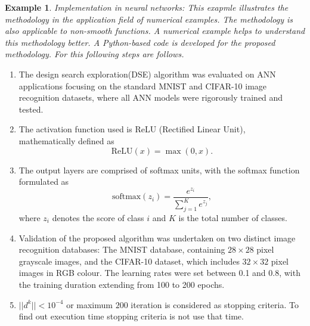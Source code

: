 \documentclass[smallextended,referee,envcountsect]{svjour3}
\newtheorem{e1}{Example}
\begin{document}
\begin{e1}{Implementation in neural networks:} \emph{This exapmle illustrates the methodology in the application field of numerical examples. The methodology is also applicable to non-smooth functions. A numerical example helps to understand this methodology better. A Python-based code is developed for the proposed methodology. For this following steps are follows.}
\end{e1}
\begin{enumerate}
    \item The design search exploration(DSE) algorithm was evaluated on ANN applications focusing on the standard MNIST and CIFAR-10 image recognition datasets, where all ANN models were rigorously trained and tested.

    \item The activation function used is ReLU (Rectified Linear Unit),\\ mathematically defined as 
    \[
    \text{ReLU}(x) = \max(0, x).
    \]
    \item The output layers are comprised of softmax units, with the softmax function formulated as 
    \[
    \text {softmax}(z_i) = \frac{e^{z_i}}{\sum_{j=1}^{K} e^{z_j}},
    \]
    where $z_i$ denotes the score of class $i$ and $K$ is the total number of classes.
    \item Validation of the proposed algorithm was undertaken on two distinct image recognition databases: The MNIST database, containing $28 \times 28$ pixel grayscale images, and the CIFAR-10 dataset, which includes $32 \times 32$ pixel images in RGB colour. The learning rates were set between 0.1 and 0.8, with the training duration extending from 100 to 200 epochs.
    \item $||d^k||< 10 ^{-4}$ or maximum $200$ iteration is considered as stopping criteria. To find out execution time stopping criteria is not use that time.
\end{enumerate}
\end{document}

